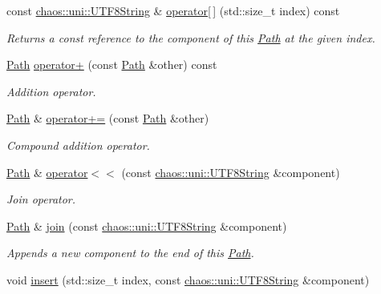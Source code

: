 \begin{DoxyCompactItemize}
const \hyperlink{classchaos_1_1uni_1_1_u_t_f8_string}{chaos\+::uni\+::\+U\+T\+F8\+String} \& \hyperlink{classchaos_1_1io_1_1sys_1_1_path_a2d2ac16a2a2964795e3872cdc9d08ab5}{operator\mbox{[}$\,$\mbox{]}} (std\+::size\+\_\+t index) const 
\begin{DoxyCompactList}\small\item\em Returns a const reference to the component of this \hyperlink{classchaos_1_1io_1_1sys_1_1_path}{Path} at the given index. \end{DoxyCompactList}\item 
\hyperlink{classchaos_1_1io_1_1sys_1_1_path}{Path} \hyperlink{classchaos_1_1io_1_1sys_1_1_path_a5e769fd87717e15f0580e9aacbc0a418}{operator+} (const \hyperlink{classchaos_1_1io_1_1sys_1_1_path}{Path} \&other) const 
\begin{DoxyCompactList}\small\item\em Addition operator. \end{DoxyCompactList}\item 
\hyperlink{classchaos_1_1io_1_1sys_1_1_path}{Path} \& \hyperlink{classchaos_1_1io_1_1sys_1_1_path_a282722770fb6950a7ec349928f019a86}{operator+=} (const \hyperlink{classchaos_1_1io_1_1sys_1_1_path}{Path} \&other)
\begin{DoxyCompactList}\small\item\em Compound addition operator. \end{DoxyCompactList}\item 
\hyperlink{classchaos_1_1io_1_1sys_1_1_path}{Path} \& \hyperlink{classchaos_1_1io_1_1sys_1_1_path_a9b3f24e1f3bcb8e989c4b21d70d0a052}{operator$<$$<$} (const \hyperlink{classchaos_1_1uni_1_1_u_t_f8_string}{chaos\+::uni\+::\+U\+T\+F8\+String} \&component)
\begin{DoxyCompactList}\small\item\em Join operator. \end{DoxyCompactList}\item 
\hyperlink{classchaos_1_1io_1_1sys_1_1_path}{Path} \& \hyperlink{classchaos_1_1io_1_1sys_1_1_path_a8fcd75bd349c4c6d1286f6549e34de8c}{join} (const \hyperlink{classchaos_1_1uni_1_1_u_t_f8_string}{chaos\+::uni\+::\+U\+T\+F8\+String} \&component)
\begin{DoxyCompactList}\small\item\em Appends a new component to the end of this \hyperlink{classchaos_1_1io_1_1sys_1_1_path}{Path}. \end{DoxyCompactList}\item 
void \hyperlink{classchaos_1_1io_1_1sys_1_1_path_a61c635ca77aee10536594cb86ed008fa}{insert} (std\+::size\+\_\+t index, const \hyperlink{classchaos_1_1uni_1_1_u_t_f8_string}{chaos\+::uni\+::\+U\+T\+F8\+String} \&component)

\end{DoxyCompactItemize}

